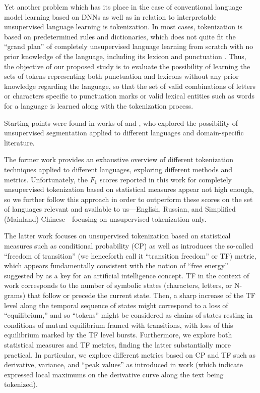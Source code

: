 \documentclass[11pt]{article}
\begin{document}
Yet another problem which has its place in the case of conventional language model learning based on DNNs \citep[see][]{1,2} as well as in relation to interpretable unsupervised language learning \citep[see][]{4,5,6} is tokenization. In most cases, tokenization is based on predetermined rules and dictionaries, which does not quite fit the “grand plan” of completely unsupervised language learning from scratch with no prior knowledge of the language, including its lexicon and punctuation \citep{3}. Thus, the objective of our proposed study is to evaluate the possibility of learning the sets of tokens representing both punctuation and lexicons without any prior knowledge regarding the language, so that the set of valid combinations of letters or characters specific to punctuation marks or valid lexical entities such as words for a language is learned along with the tokenization process.

Starting points were found in works of \citet{11} and \citet{12}, who explored the possibility of unsupervised segmentation applied to different languages and domain-specific literature.

The former work \citep[see][]{11} provides an exhaustive overview of different tokenization techniques applied to different languages, exploring different methods and metrics. Unfortunately, the $F_1$ scores reported in this work for completely unsupervised tokenization based on statistical measures appear not high enough, so we further follow this approach in order to outperform these scores on the set of languages relevant and available to us—English, Russian, and Simplified (Mainland) Chinese—focusing on unsupervised tokenization only.

The latter work \citep[see][]{12} focuses on unsupervised tokenization based on statistical measures such as conditional probability (CP) as well as introduces the so-called “freedom of transition” (we henceforth call it “transition freedom” or TF) metric, which appears fundamentally consistent with the notion of “free energy” suggested by \citet{13} as a key for an artificial intelligence concept. TF in the context of  work corresponds to the number of symbolic states (characters, letters, or N-grams) that follow or precede the current state. Then, a sharp increase of the TF level along the temporal sequence of states might correspond to a loss of  “equilibrium,” and so “tokens” might be considered as chains of states resting in conditions of mutual equilibrium framed with transitions, with loss of this equilibrium marked by the TF level bursts. Furthermore, we explore both statistical measures and TF metrics, finding the latter substantially more practical. In particular, we explore different metrics based on CP and TF such as derivative, variance, and “peak values” as introduced in  work (which indicate expressed local maximums on the derivative curve along the text being tokenized).  
\end{document}
